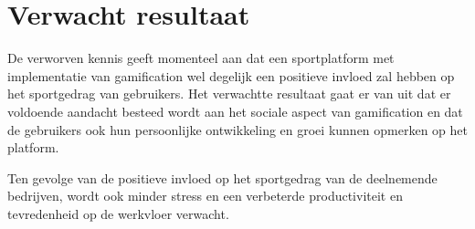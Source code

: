 \section{Verwacht resultaat}%
\label{sec:verwachte_resultaten}

De verworven kennis geeft momenteel aan dat een sportplatform met implementatie van gamification wel degelijk een positieve invloed zal hebben op het sportgedrag van gebruikers. Het verwachtte resultaat gaat er van uit dat er voldoende aandacht besteed wordt aan het sociale aspect van gamification en dat de gebruikers ook hun persoonlijke ontwikkeling en groei kunnen opmerken op het platform.

Ten gevolge van de positieve invloed op het sportgedrag van de deelnemende bedrijven, \linebreak wordt ook minder stress en een verbeterde productiviteit en tevredenheid op de werkvloer verwacht.